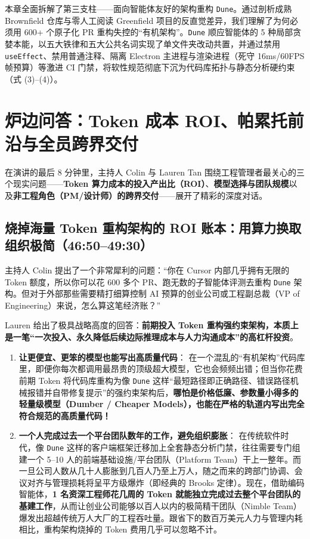 \documentclass[a4paper]{article}
\begin{document}
本章全面拆解了第三支柱——面向智能体友好的架构重构 \texttt{Dune}。通过剖析成熟 Brownfield 仓库与零人工阅读 Greenfield 项目的反直觉差异，我们理解了为何必须用 600+ 个原子化 PR 重构失控的“有机架构”。\texttt{Dune} 顺应智能体的 5 种局部贪婪本能，以五大铁律和五大公共名词实现了单文件夹改动共置，并通过禁用 \texttt{useEffect}、禁用普通注释、隔离 Electron 主进程与渲染进程（死守 16ms/60FPS 帧预算）等激进 CI 门禁，将软性规范彻底下沉为代码库拓扑与静态分析硬约束（式 (3)--(4)）。

\clearpage
\section{炉边问答：Token 成本 ROI、帕累托前沿与全员跨界交付}

在演讲的最后 8 分钟里，主持人 Colin 与 Lauren Tan 围绕工程管理者最关心的三个现实问题——\textbf{Token 算力成本的投入产出比（ROI）}、\textbf{模型选择与团队规模}以及\textbf{非工程角色（PM/设计师）的跨界交付}——展开了精彩的深度对话。

\subsection{烧掉海量 Token 重构架构的 ROI 账本：用算力换取组织极简（46:50--49:30）}

主持人 Colin 提出了一个非常犀利的问题：“你在 Cursor 内部几乎拥有无限的 Token 额度，所以你可以花 600 多个 PR、跑无数的子智能体评测去重构 \texttt{Dune} 架构。但对于外部那些需要精打细算控制 AI 预算的创业公司或工程副总裁（VP of Engineering）来说，怎么算这笔经济账？”

Lauren 给出了极具战略高度的回答：\textbf{前期投入 Token 重构强约束架构，本质上是一笔“一次投入、永久降低后续边际推理成本与人力沟通成本”的高杠杆投资}。
\begin{enumerate}
  \item \textbf{让更便宜、更笨的模型也能写出高质量代码}：
  在一个混乱的“有机架构”代码库里，即便你每次都调用最昂贵的顶级超大模型，它也会频频出错；但当你花费前期 Token 将代码库重构为像 \texttt{Dune} 这样“最短路径即正确路径、错误路径机械报错并自带修复提示”的强约束架构后，\textbf{哪怕是价格低廉、参数量小得多的轻量级模型（Dumber / Cheaper Models），也能在严格的轨道内写出完全符合规范的高质量代码！}
  \item \textbf{一个人完成过去一个平台团队数年的工作，避免组织膨胀}：
  在传统软件时代，像 \texttt{Dune} 这样的客户端框架迁移加上全套静态分析门禁，往往需要专门组建一个 5--10 人的前端基础设施/平台团队（Platform Team）干上一整年。而一旦公司人数从几十人膨胀到几百人乃至上万人，随之而来的跨部门协调、会议对齐与管理损耗将呈平方级爆炸（即经典的 Brooks 定律）。现在，借助编码智能体，\textbf{1 名资深工程师花几周的 Token 就能独立完成过去整个平台团队的基建工作}，从而让创业公司能够以百人以内的极简精干团队（Nimble Team）爆发出超越传统万人大厂的工程吞吐量。跟省下的数百万美元人力与管理内耗相比，重构架构烧掉的 Token 费用几乎可以忽略不计。
\end{enumerate}
\end{document}
